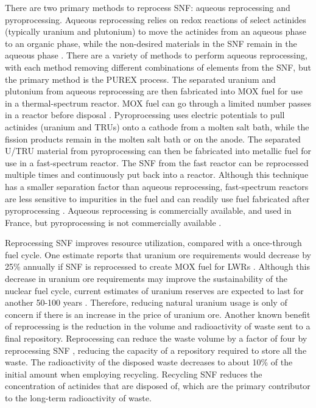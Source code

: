 There are two primary methods to reprocess \gls{SNF}: aqueous reprocessing 
and pyroprocessing. Aqueous reprocessing relies on redox reactions of 
select actinides (typically uranium and plutonium) to move the 
actinides from an aqueous phase to an organic phase, while the non-desired 
materials in the \gls{SNF} remain in the aqueous phase \cite{rodriguez-penalonga_review_2017}. 
There 
are a variety of methods to perform aqueous reprocessing, with each method 
removing different combinations of elements from the \gls{SNF}, but the primary 
method is the PUREX process. The separated uranium and plutonium from 
aqueous reprocessing are then fabricated into \gls{MOX} fuel for use in 
a thermal-spectrum reactor. \gls{MOX} fuel can go through a limited number 
passes in a reactor before disposal \cite{rodriguez-penalonga_review_2017}.
Pyroprocessing uses electric potentials to 
pull actinides (uranium and 
\glspl{TRU}) onto a cathode from a molten salt bath, while the fission products
remain in the molten salt bath or on the anode. The 
separated U/\gls{TRU} material from pyroprocessing can then be fabricated 
into metallic fuel for use in a fast-spectrum reactor. 
The \gls{SNF} from 
the fast reactor can be reprocessed multiple times and continuously put back 
into a reactor. Although this technique 
has a smaller separation factor than aqueous reprocessing, fast-spectrum 
reactors are less sensitive to impurities in the fuel and can readily use 
fuel fabricated after pyroprocessing \cite{rodriguez-penalonga_review_2017}.
Aqueous reprocessing is commercially available, and used in 
France, but pyroprocessing is not commercially available 
\cite{rodriguez-penalonga_review_2017,noauthor_status_2021}. 

Reprocessing \gls{SNF} improves resource utilization, compared 
with a once-through fuel cycle. One estimate reports that uranium ore
requirements would decrease by 25\% annually if \gls{SNF} is reprocessed 
to create \gls{MOX} fuel for \glspl{LWR} \cite{widder_benefits_2010}. 
Although this decrease in uranium ore requirements may improve the 
sustainability of the nuclear fuel cycle, current estimates of uranium 
reserves are expected to last for another 50-100 years 
\cite{widder_benefits_2010}. Therefore, reducing natural uranium usage  
is only of concern 
if there is an increase in the price of uranium ore. Another known benefit 
of reprocessing is the reduction in the volume and radioactivity of 
waste sent to a final repository. Reprocessing can reduce the waste 
volume by 
a factor of four by reprocessing \gls{SNF} \cite{widder_benefits_2010}, 
reducing the capacity of a repository required to store all the 
waste.
The radioactivity of the disposed waste decreases to about 10\% of the 
initial amount \cite{rodriguez-penalonga_review_2017} when employing 
recycling. Recycling \gls{SNF} reduces the concentration of actinides 
that are disposed of, which are the primary contributor to the long-term 
radioactivity of waste. 


